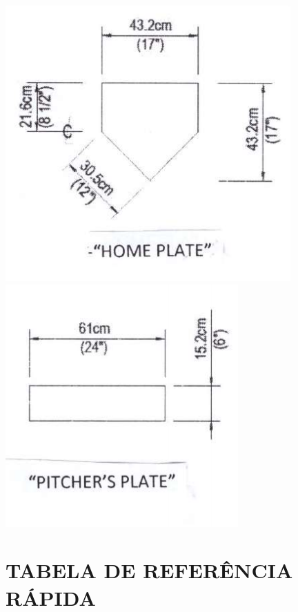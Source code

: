 {\begin{center}
		\includegraphics[width=.45\textwidth]{fig/home}
		\includegraphics[width=.45\textwidth]{fig/pitcher}
\end{center}}

\newpage
\section{TABELA DE REFERÊNCIA RÁPIDA}

